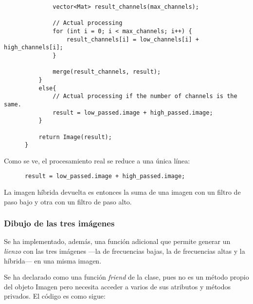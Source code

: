 \documentclass[a4paper, 11pt]{article}
\theoremstyle{definition}
\theoremstyle{theorem}
\begin{document}
\begin{lstlisting}
              vector<Mat> result_channels(max_channels);

              // Actual processing
              for (int i = 0; i < max_channels; i++) {
                  result_channels[i] = low_channels[i] + high_channels[i];
              }

              merge(result_channels, result);
          }
          else{
              // Actual processing if the number of channels is the same.
              result = low_passed.image + high_passed.image;
          }

          return Image(result);
      }

  \end{lstlisting}

  Como se ve, el procesamiento real se reduce a una única línea:
  \begin{lstlisting}
      result = low_passed.image + high_passed.image;
  \end{lstlisting}

  La imagen híbrida devuelta es entonces la suma de una imagen con un filtro de paso bajo y otra con un filtro de paso alto.

  \subsubsection*{Dibujo de las tres imágenes}
  Se ha implementado, además, una función adicional que permite generar un \emph{lienzo} con las tres imágenes ---la de frecuencias bajas, la de frecuencias altas y la híbrida--- en una misma imagen.

  Se ha declarado como una función \emph{friend} de la clase, pues no es un método propio del objeto Imagen pero necesita acceder a varios de sus atributos y métodos privados. El código es como sigue:
\end{document}
